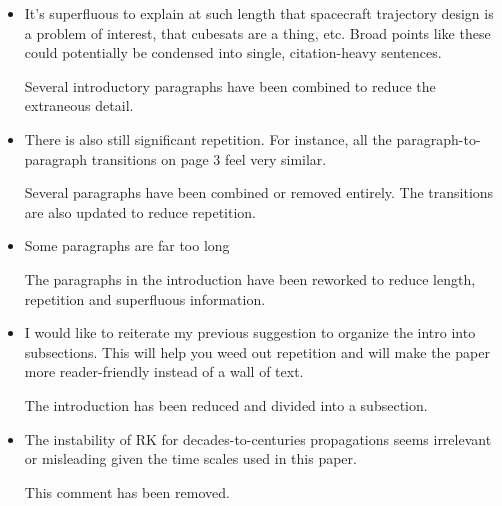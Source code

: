 \documentclass[11pt]{article}
\begin{document}
\begin{itemize}

    \item
        \begin{itshape}
            It's superfluous to explain at such length that spacecraft trajectory design is a problem of interest, that cubesats are a thing, etc. Broad points like these could potentially be condensed into single, citation-heavy sentences. 
        \end{itshape}

        Several introductory paragraphs have been combined to reduce the extraneous detail.

    \item 
        \begin{itshape}
            There is also still significant repetition. For instance, all the paragraph-to-paragraph transitions on page 3 feel very similar.
        \end{itshape}

        Several paragraphs have been combined or removed entirely. 
        The transitions are also updated to reduce repetition.

    \item 
        \begin{itshape}
            Some paragraphs are far too long
        \end{itshape}

        The paragraphs in the introduction have been reworked to reduce length, repetition and superfluous information.

    \item 
        \begin{itshape}
            I would like to reiterate my previous suggestion to organize the intro into subsections.  This will help you weed out repetition and will make the paper more reader-friendly instead of a wall of text.
        \end{itshape}

        The introduction has been reduced and divided into a subsection.

    \item 
        \begin{itshape}
            The instability of RK for decades-to-centuries propagations seems irrelevant or misleading given the time scales used in this paper.
        \end{itshape}

        This comment has been removed.


\end{itemize}
\end{document}
